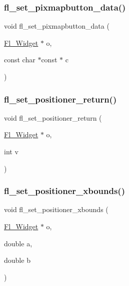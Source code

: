 \subsubsection{\texorpdfstring{fl\+\_\+set\+\_\+pixmapbutton\+\_\+data()}{fl\_set\_pixmapbutton\_data()}}
{\footnotesize\ttfamily void fl\+\_\+set\+\_\+pixmapbutton\+\_\+data (\begin{DoxyParamCaption}\item[{\hyperlink{class_fl___widget}{Fl\+\_\+\+Widget} $\ast$}]{o,  }\item[{const char $\ast$const $\ast$}]{c }\end{DoxyParamCaption})\hspace{0.3cm}{\ttfamily [inline]}}

\mbox{\label{forms_8_h_ae3fe41b8cdc1c90cb5ae66745b5349e8}} 
\subsubsection{\texorpdfstring{fl\+\_\+set\+\_\+positioner\+\_\+return()}{fl\_set\_positioner\_return()}}
{\footnotesize\ttfamily void fl\+\_\+set\+\_\+positioner\+\_\+return (\begin{DoxyParamCaption}\item[{\hyperlink{class_fl___widget}{Fl\+\_\+\+Widget} $\ast$}]{o,  }\item[{int}]{v }\end{DoxyParamCaption})\hspace{0.3cm}{\ttfamily [inline]}}

\mbox{\label{forms_8_h_ab5a39a177389f45e62d2a4164ccca6f2}} 
\subsubsection{\texorpdfstring{fl\+\_\+set\+\_\+positioner\+\_\+xbounds()}{fl\_set\_positioner\_xbounds()}}
{\footnotesize\ttfamily void fl\+\_\+set\+\_\+positioner\+\_\+xbounds (\begin{DoxyParamCaption}\item[{\hyperlink{class_fl___widget}{Fl\+\_\+\+Widget} $\ast$}]{o,  }\item[{double}]{a,  }\item[{double}]{b }\end{DoxyParamCaption})\hspace{0.3cm}{\ttfamily [inline]}}

